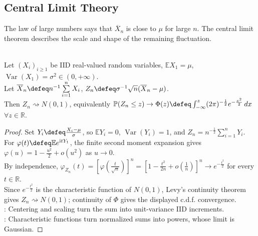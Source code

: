 \subsection{Central Limit Theory}

The law of large numbers says that $\overline{X}_n$ is close to $\mu$ for large
$n$. The central limit theorem describes the scale and shape of the remaining
fluctuation.

\begin{theorem} \label{thm:central-limit-theorem-iid} \\
Let $(X_i)_{i\geq1}$ be IID real-valued random variables, $\mathbb{E}X_1=\mu$, $\operatorname{Var}(X_1)=\sigma^2\in(0,+\infty)$.\\
Let $\overline{X}_n\defeq n^{-1}\sum\limits_{i=1}^{n}X_i$, $Z_n\defeq\sigma^{-1}\sqrt{n}(\overline{X}_n-\mu)$.\\
Then $Z_n\rightsquigarrow N(0,1)$, equivalently $\mathbb{P}(Z_n\leq z)\to\Phi(z)\defeq\int_{-\infty}^{z}(2\pi)^{-\frac{1}{2}}e^{-\frac{x^2}{2}}\,dx$ $\forall z\in\mathbb{R}$.
\begin{proof} Set $Y_i\defeq\frac{X_i-\mu}{\sigma}$, so $\mathbb{E}Y_i=0$, $\operatorname{Var}(Y_i)=1$, and $Z_n=n^{-\frac{1}{2}}\sum\limits_{i=1}^{n}Y_i$.\\
For $\varphi(t)\defeq\mathbb{E}e^{\mathrm{i}tY_1}$, the finite second moment expansion gives $\varphi(u)=1-\frac{u^2}{2}+o(u^2)$ as $u\to0$. \\
By independence, $\varphi_{Z_n}(t)=[\varphi(\frac{t}{\sqrt{n}})]^n=[1-\frac{t^2}{2n}+o(\frac{1}{n})]^n\to e^{-\frac{t^2}{2}}$ for every $t\in\mathbb{R}$. \\
Since $e^{-\frac{t^2}{2}}$ is the characteristic function of $N(0,1)$, Levy's continuity theorem gives $Z_n\rightsquigarrow N(0,1)$; continuity of $\Phi$ gives the displayed c.d.f. convergence.\\
: Centering and scaling turn the sum into unit-variance IID increments.\\
: Characteristic functions turn normalized sums into powers, whose limit is Gaussian.
\end{proof}
\end{theorem}

